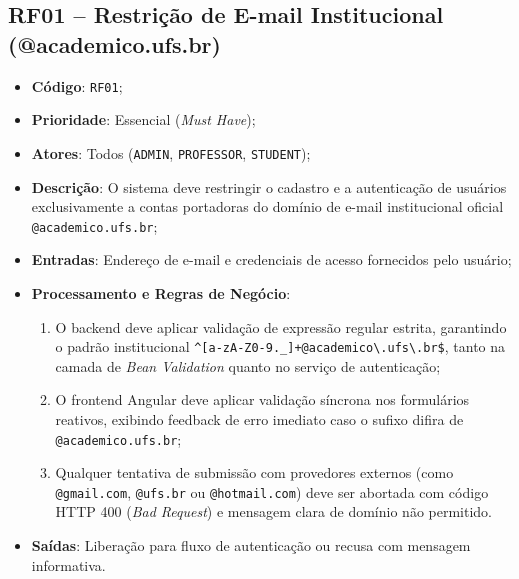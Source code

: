 \subsection{RF01 -- Restrição de E-mail Institucional (@academico.ufs.br)}
\begin{itemize}
    \item \textbf{Código}: \texttt{RF01};
    \item \textbf{Prioridade}: Essencial (\textit{Must Have});
    \item \textbf{Atores}: Todos (\texttt{ADMIN}, \texttt{PROFESSOR}, \texttt{STUDENT});
    \item \textbf{Descrição}: O sistema deve restringir o cadastro e a autenticação de usuários exclusivamente a contas portadoras do domínio de e-mail institucional oficial \texttt{@academico.ufs.br};
    \item \textbf{Entradas}: Endereço de e-mail e credenciais de acesso fornecidos pelo usuário;
    \item \textbf{Processamento e Regras de Negócio}:
    \begin{enumerate}
        \item O backend deve aplicar validação de expressão regular estrita, garantindo o padrão institucional \texttt{\textasciicircum[a-zA-Z0-9.\_]+@academico\textbackslash.ufs\textbackslash.br\$}, tanto na camada de \textit{Bean Validation} quanto no serviço de autenticação;
        \item O frontend Angular deve aplicar validação síncrona nos formulários reativos, exibindo feedback de erro imediato caso o sufixo difira de \texttt{@academico.ufs.br};
        \item Qualquer tentativa de submissão com provedores externos (como \texttt{@gmail.com}, \texttt{@ufs.br} ou \texttt{@hotmail.com}) deve ser abortada com código HTTP 400 (\textit{Bad Request}) e mensagem clara de domínio não permitido.
    \end{enumerate}
    \item \textbf{Saídas}: Liberação para fluxo de autenticação ou recusa com mensagem informativa.
\end{itemize}

